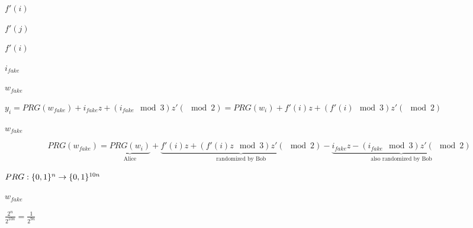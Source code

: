 \documentclass[10pt]{book}
\begin{document}
\begin{mdSnippets}
\begin{mdInlineSnippet}%
$f'(i) $\end{mdInlineSnippet}%
\begin{mdInlineSnippet}[b2c06be92490d8023131a6da7de2d0c1]%
$f'(j)$\end{mdInlineSnippet}%
\begin{mdInlineSnippet}[91e325aa5502d2676a7d4884dcdd4904]%
$f'(i)$\end{mdInlineSnippet}%
\begin{mdInlineSnippet}[76df27e221873823027ef538cabdfa4f]%
$i_{fake}$\end{mdInlineSnippet}%
\begin{mdInlineSnippet}[2b374b5d075dcc61a7893b631c61100e]%
$w_{fake}$\end{mdInlineSnippet}%
\begin{mdInlineSnippet}[175c0a6ee1b7a7c8a382bebee3ce5790]%
$y_i = PRG(w_{fake}) + i_{fake}z + (i_{fake} \mod 3)z' (\mod 2) = PRG(w_{i}) + f'(i)z + (f'(i) \mod 3)z'(\mod 2)$\end{mdInlineSnippet}%
\begin{mdInlineSnippet}[2b374b5d075dcc61a7893b631c61100e]%
$w_{fake}$\end{mdInlineSnippet}%
\begin{mdDisplaySnippet}[fed4ee6f80f3af948f5b25111d417f30]%
\[%
PRG(w_{fake}) = \underbrace{PRG(w_i)}_{\text{Alice}} + \underbrace{f'(i)z + (f'(i)z  \mod 3)z' (\mod 2)}_{\text{randomized by Bob}} - \underbrace{i_{fake}z - (i_{fake} \mod 3)z' (\mod 2)}_{\text{also randomized by Bob}}   
\]%
\end{mdDisplaySnippet}%
\begin{mdInlineSnippet}%
$PRG: \{0,1\}^n \to \{0,1\}^{10n}$\end{mdInlineSnippet}%
\begin{mdInlineSnippet}[2b374b5d075dcc61a7893b631c61100e]%
$w_{fake}$\end{mdInlineSnippet}%
\begin{mdInlineSnippet}[46459a537948e9b4e1bd60122e93b3eb]%
$\frac{2^n}{2^{10n}} = \frac{1}{2^{9n}}$\end{mdInlineSnippet}%
\begin{mdInlineSnippet}[cc2919a3f58d86a591d21036744cb831]%

\end{mdInlineSnippet}
\end{mdSnippets}
\end{document}

